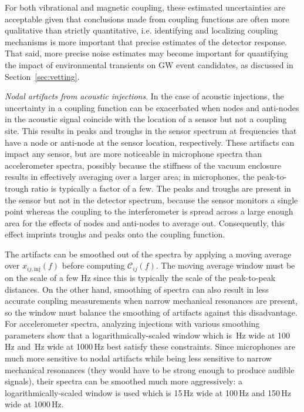 For both vibrational and magnetic coupling, these estimated uncertainties are acceptable given that conclusions made from coupling functions are often more qualitative than strictly quantitative, i.e. identifying and localizing coupling mechanisms is more important that precise estimates of the detector response.
That said, more precise noise estimates may become important for quantifying the impact of environmental transients on \ac{GW} event candidates, as discussed in Section~\ref{sec:vetting}.

\textit{Nodal artifacts from acoustic injections}.
In the case of acoustic injections, the uncertainty in a coupling function can be exacerbated when nodes and anti-nodes in the acoustic signal coincide with the location of a sensor but not a coupling site.
This results in peaks and troughs in the sensor spectrum at frequencies that have a node or anti-node at the sensor location, respectively.
These artifacts can impact any sensor, but are more noticeable in microphone spectra than accelerometer spectra, possibly because the stiffness of the vacuum enclosure results in effectively averaging over a larger area; in microphones, the peak-to-trough ratio is typically a factor of a few.
The peaks and troughs are present in the sensor but not in the detector spectrum, because the sensor monitors a single point whereas the coupling to the interferometer is spread across a large enough area for the effects of nodes and anti-nodes to average out.
Consequently, this effect imprints troughs and peaks onto the coupling function.

The artifacts can be smoothed out of the spectra by applying a moving average over $x_{ij,\mathrm{inj}}(f)$ before computing $\mathcal{C}_{ij}(f)$.
The moving average window must be on the scale of a few Hz since this is typically the scale of the peak-to-peak distances.
On the other hand, smoothing of spectra can also result in less accurate coupling measurements when narrow mechanical resonances are present, so the window must balance the smoothing of artifacts against this disadvantage.
For accelerometer spectra, analyzing injections with various smoothing parameters show that a logarithmically-scaled window which is \XX\,Hz wide at 100\,Hz and \XX\,Hz wide at 1000\,Hz best satisfy these constraints.
Since microphones are much more sensitive to nodal artifacts while being less sensitive to narrow mechanical resonances (they would have to be strong enough to produce audible signals), their spectra can be smoothed much more aggressively: a logarithmically-scaled window is used which is 15\,Hz wide at 100\,Hz and 150\,Hz wide at 1000\,Hz.

